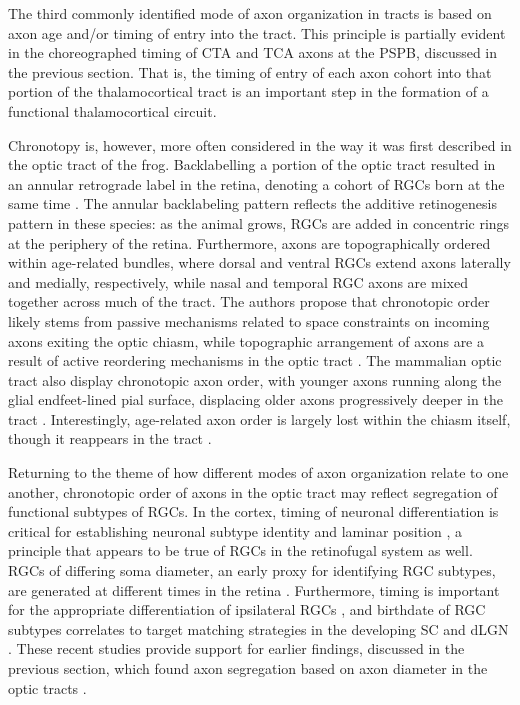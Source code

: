 The third commonly identified mode of axon organization in tracts is based on axon age and/or timing of entry into the tract. 
This principle is partially evident in the choreographed timing of CTA and TCA axons at the PSPB, discussed in the previous section.
That is, the timing of entry of each axon cohort into that portion of the thalamocortical tract is an important step in the formation of a functional thalamocortical circuit.

Chronotopy is, however, more often considered in the way it was first described in the optic tract of the frog.
Backlabelling a portion of the optic tract resulted in an annular retrograde label in the retina, denoting a cohort of RGCs born at the same time \cite{fawcett1984fibre,reh1983organization}.
The annular backlabeling pattern reflects the additive retinogenesis pattern in these species: as the animal grows, RGCs are added in concentric rings at the periphery of the retina.
Furthermore, axons are topographically ordered within age-related bundles, where dorsal and ventral RGCs extend axons laterally and medially, respectively, while nasal and temporal RGC axons are mixed together across much of the tract.
The authors propose that chronotopic order likely stems from passive mechanisms related to space constraints on incoming axons exiting the optic chiasm, while topographic arrangement of axons are a result of active reordering mechanisms in the optic tract \cite{reh1983organization}.
The mammalian optic tract also display chronotopic axon order, with younger axons running along the glial endfeet-lined pial surface, displacing older axons progressively deeper in the tract \cite{colello1992observations,reese1987distributionrat,reese1990fibre,reese1997chronotopic,walsh1985age}. %
Interestingly, age-related axon order is largely lost within the chiasm itself, though it reappears in the tract \cite{colello1998changing}. %

Returning to the theme of how different modes of axon organization relate to one another, chronotopic order of axons in the optic tract may reflect segregation of functional subtypes of RGCs.
In the cortex, timing of neuronal differentiation is critical for establishing neuronal subtype identity and laminar position \cite{molyneaux2007neuronal}, a principle that appears to be true of RGCs in the retinofugal system as well.
RGCs of differing soma diameter, an early proxy for identifying RGC subtypes, are generated at different times in the retina \cite{rapaport1995spatiotemporal,reese1994birthdates}.
Furthermore, timing is important for the appropriate differentiation of ipsilateral RGCs \cite{bhansali2014delayed}, and birthdate of RGC subtypes correlates to target matching strategies in the developing SC and dLGN \cite{osterhout2014birthdate}.
These recent studies provide support for earlier findings, discussed in the previous section, which found axon segregation based on axon diameter in the optic tracts \cite{reese1987distributionrat,guillery1982arrangement,torrealba1982studies,reese1990fibre}.

